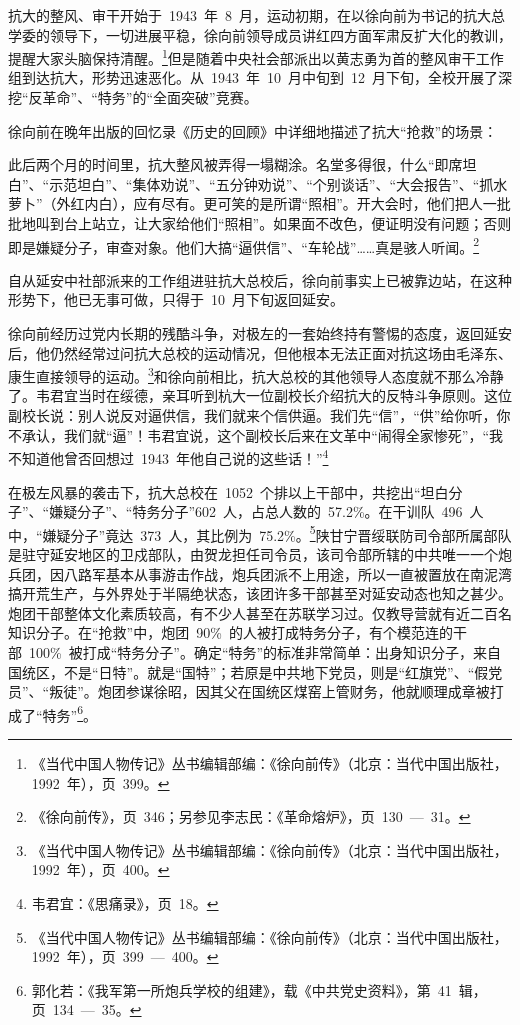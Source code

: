 抗大的整风、审干开始于~1943~年~8~月，运动初期，在以徐向前为书记的抗大总学委的领导下，一切进展平稳，徐向前领导成员讲红四方面军肃反扩大化的教训，提醒大家头脑保持清醒。\footnote{《当代中国人物传记》丛书编辑部编：《徐向前传》（北京：当代中国出版社，1992~年），页~399。}但是随着中央社会部派出以黄志勇为首的整风审干工作组到达抗大，形势迅速恶化。从~1943~年~10~月中旬到~12~月下旬，全校开展了深挖“反革命”、“特务”的“全面突破”竞赛。

徐向前在晚年出版的回忆录《历史的回顾》中详细地描述了抗大“抢救”的场景：

\begin{quoting}
此后两个月的时间里，抗大整风被弄得一塌糊涂。名堂多得很，什么“即席坦白”、“示范坦白”、“集体劝说”、“五分钟劝说”、“个别谈话”、“大会报告”、“抓水萝卜”（外红内白），应有尽有。更可笑的是所谓“照相”。开大会时，他们把人一批批地叫到台上站立，让大家给他们“照相”。如果面不改色，便证明没有问题；否则即是嫌疑分子，审查对象。他们大搞“逼供信”、“车轮战”……真是骇人听闻。\footnote{《徐向前传》，页~346；另参见李志民：《革命熔炉》，页~130~—~31。}
\end{quoting}

自从延安中社部派来的工作组进驻抗大总校后，徐向前事实上已被靠边站，在这种形势下，他已无事可做，只得于~10~月下旬返回延安。

徐向前经历过党内长期的残酷斗争，对极左的一套始终持有警惕的态度，返回延安后，他仍然经常过问抗大总校的运动情况，但他根本无法正面对抗这场由毛泽东、康生直接领导的运动。\footnote{《当代中国人物传记》丛书编辑部编：《徐向前传》（北京：当代中国出版社，1992~年），页~400。}和徐向前相比，抗大总校的其他领导人态度就不那么冷静了。韦君宜当时在绥德，亲耳听到杭大一位副校长介绍抗大的反特斗争原则。这位副校长说：别人说反对逼供信，我们就来个信供逼。我们先“信”，“供”给你听，你不承认，我们就“逼”！韦君宜说，这个副校长后来在文革中“闹得全家惨死”，“我不知道他曾否回想过~1943~年他自己说的这些话！”\footnote{韦君宜：《思痛录》，页~18。}

在极左风暴的袭击下，抗大总校在~1052~个排以上干部中，共挖出“坦白分子”、“嫌疑分子”、“特务分子”602~人，占总人数的~57.2\%。在干训队~496~人中，“嫌疑分子”竟达~373~人，其比例为~75.2\%。\footnote{《当代中国人物传记》丛书编辑部编：《徐向前传》（北京：当代中国出版社，1992~年），页~399~—~400。}陕甘宁晋绥联防司令部所属部队是驻守延安地区的卫戍部队，由贺龙担任司令员，该司令部所辖的中共唯一一个炮兵团，因八路军基本从事游击作战，炮兵团派不上用途，所以一直被置放在南泥湾搞开荒生产，与外界处于半隔绝状态，该团许多干部甚至对延安动态也知之甚少。炮团干部整体文化素质较高，有不少人甚至在苏联学习过。仅教导营就有近二百名知识分子。在“抢救”中，炮团~90\%~的人被打成特务分子，有个模范连的干部~100\%~被打成“特务分子”。确定“特务”的标准非常简单：出身知识分子，来自国统区，不是“日特”。就是“国特”；若原是中共地下党员，则是“红旗党”、“假党员”、“叛徒”。炮团参谋徐昭，因其父在国统区煤窑上管财务，他就顺理成章被打成了“特务”\footnote{郭化若：《我军第一所炮兵学校的组建》，载《中共党史资料》，第~41~辑，页~134~—~35。}。

